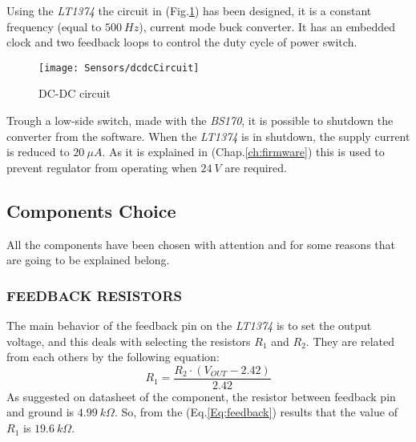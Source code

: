 Using the \textit{LT1374} the circuit in (Fig.\ref{Fig:DCDC}) has been designed, it is a constant frequency (equal to $500\ Hz$), current mode buck converter. It has an embedded clock and two feedback loops to control the duty cycle of power switch.\\

\begin{figure}[h]
	\begin{center}
		\texttt{[image: Sensors/dcdcCircuit]}
		\caption{DC-DC circuit}
		\label{Fig:DCDC}
	\end{center}
\end{figure}


Trough a low-side switch, made with the \textit{BS170}, it is possible to shutdown the converter from the software. When the \textit{LT1374} is in shutdown, the supply current is reduced to $20\ \mu A$. As it is explained in (Chap.\ref{ch:firmware}) this is used to prevent regulator from operating when $24\ V$ are required.\\

\subsection{Components Choice}

All the components have been chosen with attention and for some reasons that are going to be explained belong.
\subsubsection{FEEDBACK RESISTORS}
The main behavior of the feedback pin on the \textit{LT1374} is to set the output voltage, and this deals with selecting the resistors $R_1$ and $R_2$. They are related from each others by the following equation:
\begin{equation}
R_1 = \frac{R_2 \cdot \left( V_{OUT} - 2.42\right)}{2.42}
\label{Eq:feedback}
\end{equation}
As suggested on datasheet of the component, the resistor between feedback pin and ground is $4.99\ k\varOmega$. So, from the (Eq.\ref{Eq:feedback}) results that the value of $R_1$ is $19.6\ k\varOmega$.
